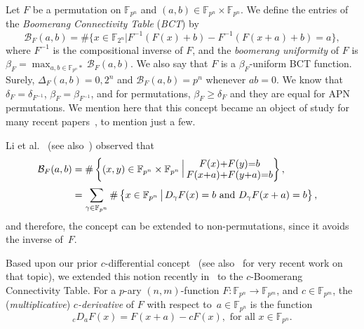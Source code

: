 \documentclass[11pt]{article}
\newcommand{\cB}{\mathscr{B}}
\def\cB{{\mathcal B}}
\def\F{{\mathbb F}}
\def\Fn{{\mathbb{F}_{p^n}}}
\def\\{\cr}
\newcommand{\cardinality}[1]{\# #1}
\begin{document}
Let $F$ be a permutation on $\F_{p^n}$  and $(a,b)\in\F_{p^n}\times \F_{p^n}$. We define the entries of the {\em Boomerang Connectivity Table} \textup{(}{\em BCT}\textup{)} by
\[
\cB_F(a,b)=\cardinality \{x\in\F_{2^n}|F^{-1} (F(x)+b)-F^{-1}(F(x+a)+b)=a  \},
\]
where $F^{-1}$ is the compositional inverse of $F$, and the {\em boomerang uniformity} of $F$  is
$\displaystyle
\beta_F=\max_{a,b\in\Fn*} \cB_F(a,b).
$
We also say that $F$ is a $\beta_F$-uniform BCT function. Surely, $\Delta_F(a,b)=0,2^n$ and $\cB_F(a,b)=p^n$  whenever $ab=0$. We know that $\delta_F=\delta_{F^{-1}}$, $\beta_F=\beta_{F^{-1}}$, and  for permutations, $\beta_F\geq \delta_F$ and they are equal for APN permutations.    
 We mention here that this concept became an object of study for many recent papers~\cite{BC18, BPT19, CV19,Li19, LiHu20, Mes19,TX20}, to mention just a few.  
 
  Li et al.~\cite{Li19} (see also~\cite{Mes19}) observed that
\begin{equation*}
\begin{split}
\label{eq:boom-diff}
\cB_F(a,b)&=\cardinality \left\{ (x,y)\in\Fn\times \Fn\,\Large\big|\, \substack{F(x)+F(y)=b \\  F(x+a)+F(y+a)=b } \right\}, \\
& =\sum_{\gamma\in\Fn} \cardinality  \left\{ x \in\Fn \,\big|\, D_\gamma F(x)=b \text{ and }  D_\gamma F(x+a)=b   \right\},
\end{split}
\end{equation*}
and therefore, the concept can be extended to non-permutations, since it avoids the inverse of~$F$.

 
Based upon our prior $c$-differential concept~\cite{EFRST20} (see also~\cite{HMRS20,RS20,SG20,YZ20} for very recent work on that topic), we extended this notion recently in~\cite{S20} to the $c$-Boomerang Connectivity Table.
For a $p$-ary $(n,m)$-function   $F:\F_{p^n}\to \F_{p^m}$, and $c\in\F_{p^m}$, the ({\em multiplicative}) {\em $c$-derivative} of $F$ with respect to~$a \in \F_{p^n}$ is the  function
\[
 _cD_{a}F(x) =  F(x + a)- cF(x), \mbox{ for  all }  x \in \F_{p^n}.
\]
\end{document}
